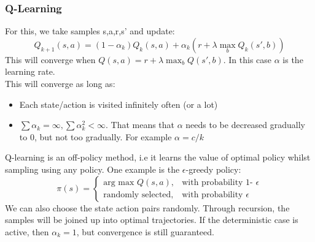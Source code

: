 \documentclass{article}
\begin{document}
\subsubsection{Q-Learning}
For this, we take samples s,a,r,s' and update:
\[
Q_{k+1}(s,a) = (1- \alpha_k)Q_k(s,a) + \alpha_k(r + \lambda \max_b Q_k(s',b))
\]
This will converge when $Q(s,a) = r + \lambda \max_b Q(s',b)$. In this case $\alpha$ is the learning rate. \\
This will converge as long as:
\begin{itemize}
    \item Each state/action is visited infinitely often (or a lot)
    \item $\sum \alpha_k = \infty, \sum \alpha_k^2 < \infty$. That means that $\alpha$ needs to be decreased gradually to 0, but not too gradually. For example $\alpha = c/k$
\end{itemize}
Q-learning is an off-policy method, i.e it learns the value of optimal policy whilst sampling using any policy. One example is the $\epsilon$-greedy policy:
\[
\pi(s) = \begin{cases}
    \text{arg max } Q(s,a), & \text{with probability 1- $\epsilon$} \\
    \text{randomly selected,} & \text{with probability $\epsilon$}
\end{cases}
\]
We can also choose the state action pairs randomly. Through recursion, the samples will be joined up into optimal trajectories. If the deterministic case is active, then $\alpha_k = 1$, but convergence is still guaranteed.
\end{document}
